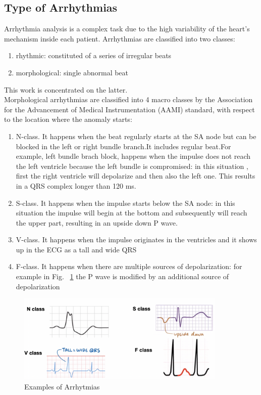 \documentclass[LaM,binding=0.6cm]{sapthesis}
\begin{document}
\subsection{Type of Arrhythmias}
Arrhythmia analysis is a complex task due to the high variability of the heart's mechanism inside each patient. Arrhythmias are classified into two classes:
\begin{enumerate}
\item rhythmic: constituted of a series of irregular beats
\item morphological: single abnormal beat
\end{enumerate}
This work is concentrated on the latter.\\Morphological arrhythmias are classified into 4 macro classes by the Association for the Advancement of Medical Instrumentation (AAMI) standard, with respect to the location where the anomaly starts:
\begin{enumerate}
\item N-class. It happens when the beat regularly starts at the SA node but can be blocked in the left or right bundle branch.It includes regular beat.For example, left bundle brach block, happens when the impulse does not reach the left ventricle because the left bundle is compromised: in this situation , first the right ventricle will depolarize and then also the left one. This results in a QRS complex longer than 120 ms.
\item S-class. It happens when the impulse starts below the SA node: in this situation the impulse will begin at the bottom and subsequently will reach the upper part, resulting in an upside down P wave.
\item V-class. It happens when the impulse originates in the ventricles and it shows up in the ECG as a tall and wide QRS
\item F-class. It happens when there are multiple sources of depolarization: for example in Fig. ~\ref{fig:arrhex} the P wave is modified by an additional source of depolarization
\end{enumerate}
\begin{figure}[H]  \centering
	\includegraphics[width=100mm,scale=0.7]{arrhex}
	\caption{Examples of Arrhytmias}
	\label{fig:arrhex}
\end{figure}
\end{document}
